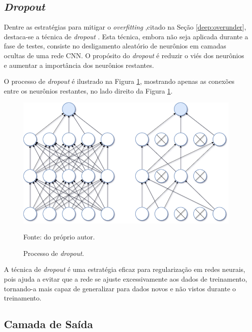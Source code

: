 \subsection{\textit{Dropout}}
\label{cnn:dropout}

Dentre as estratégias para mitigar o \textit{overfitting} ,citado na Seção \ref{deep:overunder}, destaca-se a técnica de \textit{dropout} \citep{Goodfellow2016}. Esta técnica, embora não seja aplicada durante a fase de testes, consiste no desligamento aleatório de neurônios em camadas ocultas de uma rede CNN. O propósito do \textit{dropout} é reduzir o viés dos neurônios e aumentar a importância dos neurônios restantes.

O processo de \textit{dropout} é ilustrado na Figura \ref{cnn:fig:9}, mostrando apenas as conexões entre os neurônios restantes, no lado direito da Figura \ref{cnn:fig:9}.

\begin{figure}[H]
    \centering
    \caption{Processo de \textit{dropout}.}
    \includegraphics[width=1\linewidth]{recursos/imagens/deep/dropout.png}
    \label{cnn:fig:9}

     Fonte: do próprio autor.
\end{figure}

A técnica de \textit{dropout} é uma estratégia eficaz para regularização em redes neurais, pois ajuda a evitar que a rede se ajuste excessivamente aos dados de treinamento, tornando-a mais capaz de generalizar para dados novos e não vistos durante o treinamento.

\subsection{Camada de Saída}
\label{cnn:output}

